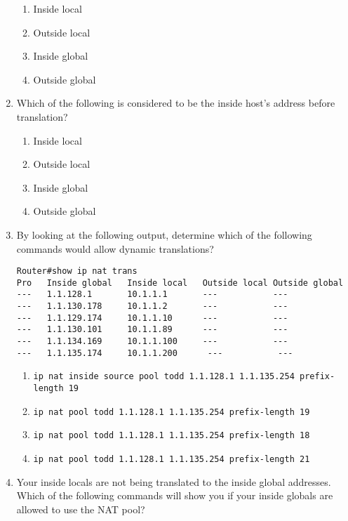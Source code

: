 \begin{enumerate}
  \begin{enumerate}
  \tightlist
  \item
    Inside local
  \item
    Outside local
  \item
    Inside global
  \item
    Outside global
  \end{enumerate}
\item
  Which of the following is considered to be the inside host's address
  before translation?

  \begin{enumerate}
  \tightlist
  \item
    Inside local
  \item
    Outside local
  \item
    Inside global
  \item
    Outside global
  \end{enumerate}
\item
  By looking at the following output, determine which of the following
  commands would allow dynamic translations?

\begin{verbatim}
Router#show ip nat trans
Pro   Inside global   Inside local   Outside local Outside global
---   1.1.128.1       10.1.1.1       ---           ---
---   1.1.130.178     10.1.1.2       ---           ---
---   1.1.129.174     10.1.1.10      ---           ---
---   1.1.130.101     10.1.1.89      ---           ---
---   1.1.134.169     10.1.1.100     ---           ---
---   1.1.135.174     10.1.1.200      ---           ---
\end{verbatim}

  \begin{enumerate}
  \tightlist
  \item
    \texttt{ip\ nat\ inside\ source\ pool\ todd\ 1.1.128.1\ 1.1.135.254\ prefix-length\ 19}
  \item
    \texttt{ip\ nat\ pool\ todd\ 1.1.128.1\ 1.1.135.254\ prefix-length\ 19}
  \item
    \texttt{ip\ nat\ pool\ todd\ 1.1.128.1\ 1.1.135.254\ prefix-length\ 18}
  \item
    \texttt{ip\ nat\ pool\ todd\ 1.1.128.1\ 1.1.135.254\ prefix-length\ 21}
  \end{enumerate}
\item
  Your inside locals are not being translated to the inside global
  addresses. Which of the following commands will show you if your
  inside globals are allowed to use the NAT pool?


\end{enumerate}
